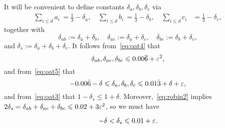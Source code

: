 It will be convenient to define constants $\delta_a,\delta_b,\delta_c$ via
\begin{align}\label{eq:ai1/3}
\sum_{i\leq d} a_i \, = \frac{1}{3}-\delta_a, \quad \sum_{i\leq d} b_i \, = \frac{1}{3}-\delta_b, \quad \sum_{i\leq d} c_i &= \frac{1}{3}-\delta_c,
\end{align}
together with
\[
\delta_{ab}:=\delta_a+\delta_b,\quad \delta_{ac}:=\delta_a+\delta_c, \quad \delta_{bc}:=\delta_b+\delta_c,
\]
and $\delta_s := \delta_a+\delta_b+\delta_c$. It follows from~\eqref{eq:oat4} that
\begin{equation}\label{eq:robin2}
\delta_{ab}, \delta_{ac}, \delta_{bc} \leqslant 0.00\overline{6} + \varepsilon^2,
\end{equation}
and from~\eqref{eq:oat5} that
\begin{equation}\label{eq:robin1}
-0.00\bar 6 - \delta
\leqslant \delta_a,\delta_b,\delta_c \leqslant
0.01\bar3+\delta+\varepsilon,
\end{equation}
and from~\eqref{eq:oat3} that
$
1-\delta_s\leq 1+\delta.
$
Moreover,~\eqref{eq:robin2} implies $2\delta_s = \delta_{ab}+ \delta_{ac}+ \delta_{bc}\leqslant 0.02 + 3\varepsilon^2$, so we must have
\begin{lemma}\label{lem:robin3}
  \begin{equation}\label{eq:robin3}
    -\delta <
    \delta_s \leqslant 0.01+\varepsilon.
    \end{equation}
\end{lemma}

